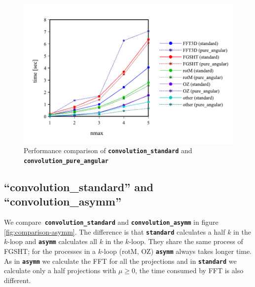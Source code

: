 \begin{figure}[H]
\begin{centering}
\includegraphics[bb=0bp 20bp 667bp 268bp,width=1\columnwidth]{_figure/results/pure_angular}
\par\end{centering}
\caption[Performance comparison of ``convolution\_standard'' and ``convolution\_pure\_angular'']{Performance comparison of \texttt{\textbf{convolution\_standard}}
and \texttt{\textbf{convolution\_pure\_angular\label{fig:comparison-pure_angular}}}}
\end{figure}


\subsection{``convolution\_standard'' and ``convolution\_asymm''}

We compare\texttt{\textbf{ convolution\_standard}} and \texttt{\textbf{convolution\_asymm}}
in figure \ref{fig:comparison-asymm}. The difference is that \texttt{\textbf{standard}}
calculates a half $k$ in the $k$-loop and \texttt{\textbf{asymm}}
calculates all $k$ in the $k$-loop. They share the same process
of \acs{FGSHT}; for the processes in a $k$-loop (rotM, OZ) \texttt{\textbf{asymm}}
always takes longer time. As in \texttt{\textbf{asymm}} we calculate
the \acs{FFT} for all the projections and in \texttt{\textbf{standard}}
we calculate only a half projections with $\mu\geq0$, the time consumed
by \acs{FFT} is also different.

